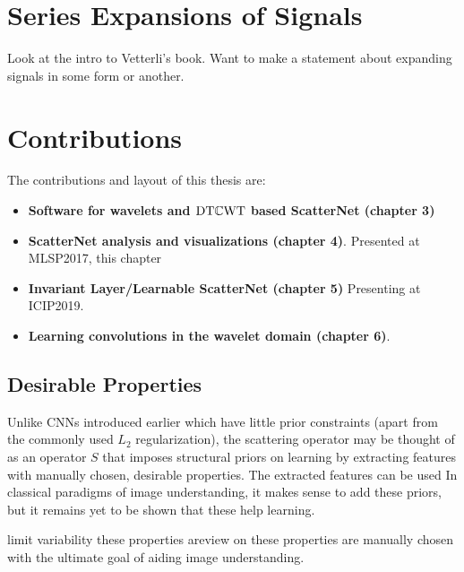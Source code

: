 \section{Series Expansions of Signals}
Look at the intro to Vetterli's book. Want to make a statement about expanding
signals in some form or another.

\section{Contributions}
The contributions and layout of this thesis are:

\begin{itemize}
  \item \textbf{Software for wavelets and $\mathrm{DT}\mathbb{C}\mathrm{WT}$ based ScatterNet (chapter 3)}
  \item \textbf{ScatterNet analysis and visualizations (chapter 4)}. Presented
    at MLSP2017, this chapter 
  \item \textbf{Invariant Layer/Learnable ScatterNet (chapter 5)} Presenting at
    ICIP2019.
  \item \textbf{Learning convolutions in the wavelet domain (chapter 6)}.
\end{itemize}

\subsection{Desirable Properties}
Unlike CNNs introduced earlier which have little prior constraints (apart
from the commonly used $L_2$ regularization), the scattering operator may be 
thought of as an operator $S$ that imposes structural priors on learning by
extracting features with manually chosen, desirable properties. The extracted
features can be used In classical
paradigms of image understanding, it makes sense to add these priors, but it
remains yet to be shown that these help learning.

limit variability these properties areview on these
properties are manually chosen with the ultimate goal of aiding image
understanding. 

